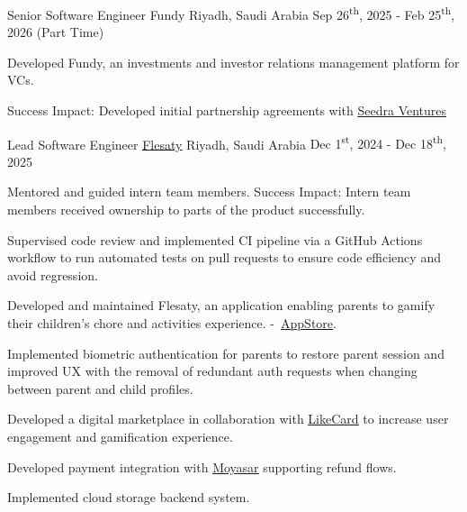\begingroup \let\originalhref\href \renewcommand{\href}[2]{\underline{\originalhref{#1}{#2}}}


\begin{cventries}
    \cventry
    {Senior Software Engineer}
    {Fundy}
    {Riyadh, Saudi Arabia}
    {Sep 26\textsuperscript{th}, 2025 - Feb 25\textsuperscript{th}, 2026 (Part Time)}
    {
        \begin{cvitems}
            \item {Developed Fundy, an investments and investor relations management platform for VCs.}
            \item {Success Impact: Developed initial partnership agreements with \href{https://seedra.com/}{Seedra Ventures}}
        \end{cvitems}
    }

    \cventry
    {Lead Software Engineer}
    {\href{https://linktr.ee/flesaty}{Flesaty}}
    {Riyadh, Saudi Arabia}
    {Dec 1\textsuperscript{st}, 2024 - Dec 18\textsuperscript{th}, 2025}
    {
        \begin{cvitems}
            \item {Mentored and guided intern team members. Success Impact: Intern team members received ownership to parts of the product successfully.}
            \item {Supervised code review and implemented CI pipeline via a GitHub Actions workflow to run automated tests on pull requests to ensure code efficiency and avoid regression.}
            \item {Developed and maintained Flesaty, an application enabling parents to gamify their children's chore and activities experience. -\ \href{https://apps.apple.com/us/app/flesaty/id6476162005}{AppStore}.}
            \item {Implemented biometric authentication for parents to restore parent session and improved UX with the removal of redundant auth requests when changing between parent and child profiles.}
            \item {Developed a digital marketplace in collaboration with \href{https://en-saudi.likecard.com}{LikeCard} to increase user engagement and gamification experience.}
            \item {Developed payment integration with \href{https://moyasar.com/en}{Moyasar} supporting refund flows.}
            \item {Implemented cloud storage backend system.}
        \end{cvitems}
    }


\end{cventries}
